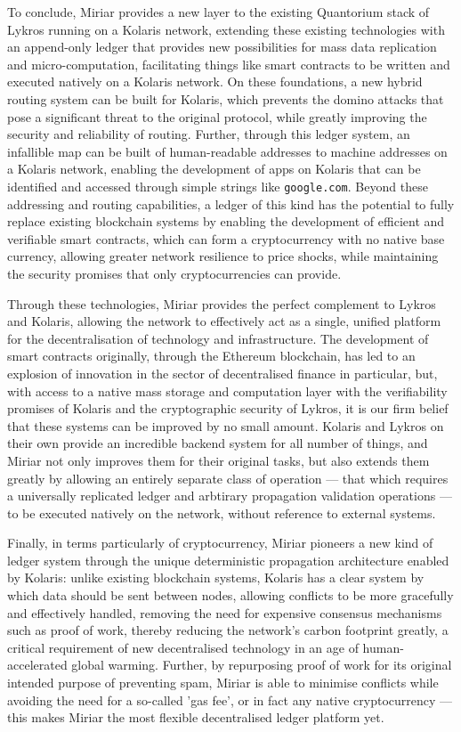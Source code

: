 \documentclass{extreport}
\begin{document}
To conclude, Miriar provides a new layer to the existing Quantorium stack of Lykros running on a Kolaris network, extending these existing technologies with an append-only ledger that provides new possibilities for mass data replication and micro-computation, facilitating things like smart contracts to be written and executed natively on a Kolaris network. On these foundations, a new hybrid routing system can be built for Kolaris, which prevents the domino attacks that pose a significant threat to the original protocol, while greatly improving the security and reliability of routing. Further, through this ledger system, an infallible map can be built of human-readable addresses to machine addresses on a Kolaris network, enabling the development of apps on Kolaris that can be identified and accessed through simple strings like \texttt{google.com}. Beyond these addressing and routing capabilities, a ledger of this kind has the potential to fully replace existing blockchain systems by enabling the development of efficient and verifiable smart contracts, which can form a cryptocurrency with no native base currency, allowing greater network resilience to price shocks, while maintaining the security promises that only cryptocurrencies can provide.

Through these technologies, Miriar provides the perfect complement to Lykros and Kolaris, allowing the network to effectively act as a single, unified platform for the decentralisation of technology and infrastructure. The development of smart contracts originally, through the Ethereum blockchain, has led to an explosion of innovation in the sector of decentralised finance in particular, but, with access to a native mass storage and computation layer with the verifiability promises of Kolaris and the cryptographic security of Lykros, it is our firm belief that these systems can be improved by no small amount. Kolaris and Lykros on their own provide an incredible backend system for all number of things, and Miriar not only improves them for their original tasks, but also extends them greatly by allowing an entirely separate class of operation --- that which requires a universally replicated ledger and arbtirary propagation validation operations --- to be executed natively on the network, without reference to external systems.

Finally, in terms particularly of cryptocurrency, Miriar pioneers a new kind of ledger system through the unique deterministic propagation architecture enabled by Kolaris: unlike existing blockchain systems, Kolaris has a clear system by which data should be sent between nodes, allowing conflicts to be more gracefully and effectively handled, removing the need for expensive consensus mechanisms such as proof of work, thereby reducing the network's carbon footprint greatly, a critical requirement of new decentralised technology in an age of human-accelerated global warming. Further, by repurposing proof of work for its original intended purpose of preventing spam, Miriar is able to minimise conflicts while avoiding the need for a so-called 'gas fee', or in fact any native cryptocurrency --- this makes Miriar the most flexible decentralised ledger platform yet.
\end{document}
